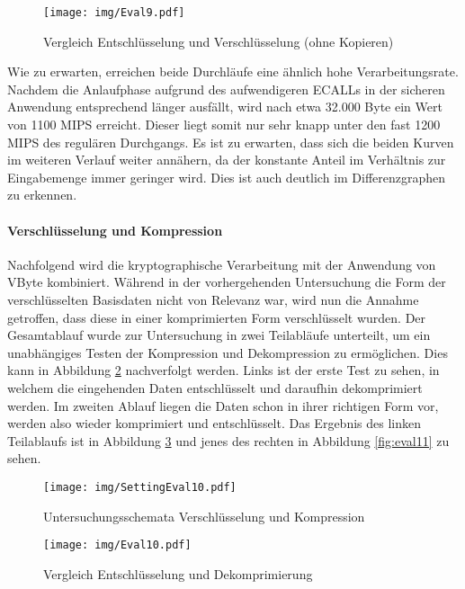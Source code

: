 \begin{figure}[h]
	\texttt{[image: img/Eval9.pdf]}
	\centering
	\caption{Vergleich Entschlüsselung und Verschlüsselung (ohne Kopieren)}
	\label{fig:eval9}
\end{figure}

Wie zu erwarten, erreichen beide Durchläufe eine ähnlich hohe Verarbeitungsrate. Nachdem die Anlaufphase aufgrund des aufwendigeren ECALLs in der sicheren Anwendung entsprechend länger ausfällt, wird nach etwa 32.000 Byte ein Wert von 1100 MIPS erreicht. Dieser liegt somit nur sehr knapp unter den fast 1200 MIPS des regulären Durchgangs. Es ist zu erwarten, dass sich die beiden Kurven im weiteren Verlauf weiter annähern, da der konstante Anteil im Verhältnis zur Eingabemenge immer geringer wird. Dies ist auch deutlich im Differenzgraphen zu erkennen.

\paragraph{Verschlüsselung und Kompression}

Nachfolgend wird die kryptographische Verarbeitung mit der Anwendung von VByte kombiniert. Während in der vorhergehenden Untersuchung die Form der verschlüsselten Basisdaten nicht von Relevanz war, wird nun die Annahme getroffen, dass diese in einer komprimierten Form verschlüsselt wurden. Der Gesamtablauf wurde zur Untersuchung in zwei Teilabläufe unterteilt, um ein unabhängiges Testen der Kompression und Dekompression zu ermöglichen. Dies kann in Abbildung \ref{fig:settingeval10} nachverfolgt werden. Links ist der erste Test zu sehen, in welchem die eingehenden Daten entschlüsselt und daraufhin dekomprimiert werden. Im zweiten Ablauf liegen die Daten schon in ihrer richtigen Form vor, werden also wieder komprimiert und entschlüsselt. Das Ergebnis des linken Teilablaufs ist in Abbildung \ref{fig:eval10} und jenes des rechten in Abbildung \ref{fig:eval11} zu sehen.

\begin{figure}[h]
	\texttt{[image: img/SettingEval10.pdf]}
	\centering
	\caption{Untersuchungsschemata Verschlüsselung und Kompression}
	\label{fig:settingeval10}
\end{figure}

\begin{figure}[h]
	\texttt{[image: img/Eval10.pdf]}
	\centering
	\caption{Vergleich Entschlüsselung und Dekomprimierung}
	\label{fig:eval10}
\end{figure}

